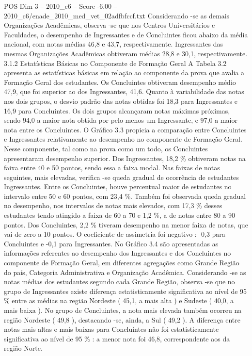 \begin{textsample}{POS Dim 3 – 2010\_c6 – Score -6.00 – 2010\_c6/enade\_2010\_med\_vet\_02adfbfccf.txt}
Considerando -se as demais Organizações Acadêmicas, observa -se que nos Centros Universitários e Faculdades, o desempenho de Ingressantes e de Concluintes ficou abaixo da média nacional, com notas médias 46,8 e 43,7, respectivamente.
Ingressantes das mesmas Organizações Acadêmicas obtiveram médias 28,8 e 30,1, respectivamente. 3.1.2 Estatísticas Básicas no Componente de Formação Geral A Tabela 3.2 apresenta as estatísticas básicas em relação ao componente da prova que avalia a Formação Geral dos estudantes.
Os Concluintes obtiveram desempenho médio 47,9, que foi superior ao dos Ingressantes, 41,6.
Quanto à variabilidade das notas nos dois grupos, o desvio padrão das notas obtidas foi 18,3 para Ingressantes e 16,9 para Concluintes.
Os dois grupos alcançaram notas máximas próximas, sendo 94,0 a maior nota obtida por pelo menos um Ingressante, e 97,0 a maior nota entre os Concluintes.
O Gráfico 3.3 propicia a comparação entre Concluintes e Ingressantes relativamente ao desempenho no componente de Formação Geral.
Nesse componente, tal como na prova como um todo, os Concluintes apresentaram desempenho superior.
Dos Ingressantes, 18,2 \% obtiveram notas na faixa entre 40 e 50 pontos, sendo essa a faixa modal.
Nas faixas de notas seguintes, mais elevadas, verifica -se queda gradual de ocorrência de estudantes Ingressantes.
Entre os Concluintes, houve percentual maior de estudantes no intervalo entre 50 e 60 pontos, com 23,4 \%.
Também foi observada queda gradual no desempenho, nos intervalos de notas mais elevados, com 17,3 \% desses estudantes tendo atingido a faixa de 60 a 70 e 1,2 \%, a de notas entre 80 a 90 pontos.
Dos Concluintes, 2,2 \% tiveram desempenho na menor faixa de notas, que vai de zero a 10 pontos.
O coeficiente de assimetria foi negativo : -0,3 para Concluintes e -0,1 para Ingressantes.
No Gráfico 3.4 são apresentadas as informações referentes ao desempenho dos Ingressantes e dos Concluintes no componente de Formação Geral, em diferentes agregações como Grande Região do país, Categoria Administrativa e Organização Acadêmica.
Considerando -se as notas médias dos estudantes segundo cada Grande Região, observa -se que no grupo de Ingressantes existe diferença estatisticamente significativa ao nível de 95 \% entre as médias na região Nordeste ( 45,1, a mais alta ) e Sudeste ( 40,0, a mais baixa ).
No grupo de Concluintes, a nota mais elevada também ocorreu na região Nordeste ( 49,8 ), destacando -se, ainda, a Sul ( 49,2 ).
A diferença entre notas mais altas e mais baixas para Concluintes não foi estatisticamente significativa ao nível de 95 \% : a menor nota foi 46,8, correspondente aos da região Norte.

\end{textsample}
